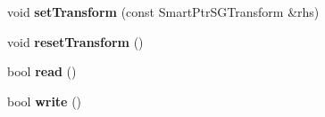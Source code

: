 \begin{DoxyCompactItemize}
\item 
\hypertarget{classps_1_1scene_1_1SGNode_add7bf24c519c2d8bacdb2d1e845091b9}{}void {\bfseries set\+Transform} (const Smart\+Ptr\+S\+G\+Transform \&rhs)\label{classps_1_1scene_1_1SGNode_add7bf24c519c2d8bacdb2d1e845091b9}

\item 
\hypertarget{classps_1_1scene_1_1SGNode_ae6e30d330b583ea8d896b684f2250ea3}{}void {\bfseries reset\+Transform} ()\label{classps_1_1scene_1_1SGNode_ae6e30d330b583ea8d896b684f2250ea3}

\item 
\hypertarget{classps_1_1scene_1_1SGNode_abe81619307d1ad4a16e6c3c629e114b8}{}bool {\bfseries read} ()\label{classps_1_1scene_1_1SGNode_abe81619307d1ad4a16e6c3c629e114b8}

\item 
\hypertarget{classps_1_1scene_1_1SGNode_a3f4c5597ed44a634681a871d267a36f7}{}bool {\bfseries write} ()\label{classps_1_1scene_1_1SGNode_a3f4c5597ed44a634681a871d267a36f7}

\end{DoxyCompactItemize}
